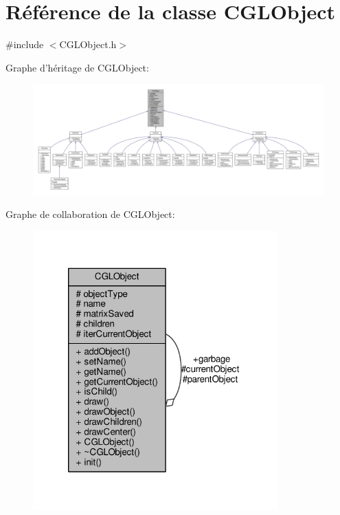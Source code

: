 \hypertarget{class_c_g_l_object}{\section{Référence de la classe C\-G\-L\-Object}
\label{class_c_g_l_object}
}


{\ttfamily \#include $<$C\-G\-L\-Object.\-h$>$}



Graphe d'héritage de C\-G\-L\-Object\-:
\nopagebreak
\begin{figure}[H]
\begin{center}
\leavevmode
\includegraphics[width=350pt]{d8/d78/class_c_g_l_object__inherit__graph}
\end{center}
\end{figure}


Graphe de collaboration de C\-G\-L\-Object\-:\nopagebreak
\begin{figure}[H]
\begin{center}
\leavevmode
\includegraphics[width=267pt]{dd/dbf/class_c_g_l_object__coll__graph}
\end{center}
\end{figure}
